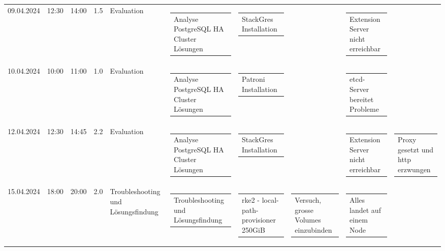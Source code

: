 {\begin{longtable}[H]{lllrllllll}
09.04.2024 & 12:30 & 14:00 & 1.5 & Evaluation & \begin{tabular}[c]{@{}l@{}}Analyse PostgreSQL HA Cluster Lösungen\end{tabular} & \begin{tabular}[c]{@{}l@{}}StackGres Installation\end{tabular} & \begin{tabular}[c]{@{}l@{}}\end{tabular} & \begin{tabular}[c]{@{}l@{}}Extension Server nicht erreichbar\end{tabular} & \begin{tabular}[c]{@{}l@{}}\end{tabular} \\
10.04.2024 & 10:00 & 11:00 & 1.0 & Evaluation & \begin{tabular}[c]{@{}l@{}}Analyse PostgreSQL HA Cluster Lösungen\end{tabular} & \begin{tabular}[c]{@{}l@{}}Patroni Installation\end{tabular} & \begin{tabular}[c]{@{}l@{}}\end{tabular} & \begin{tabular}[c]{@{}l@{}}etcd-Server bereitet Probleme\end{tabular} & \begin{tabular}[c]{@{}l@{}}\end{tabular} \\
12.04.2024 & 12:30 & 14:45 & 2.2 & Evaluation & \begin{tabular}[c]{@{}l@{}}Analyse PostgreSQL HA Cluster Lösungen\end{tabular} & \begin{tabular}[c]{@{}l@{}}StackGres Installation\end{tabular} & \begin{tabular}[c]{@{}l@{}}\end{tabular} & \begin{tabular}[c]{@{}l@{}}Extension Server nicht erreichbar\end{tabular} & \begin{tabular}[c]{@{}l@{}}Proxy gesetzt und http erzwungen\end{tabular} \\
15.04.2024 & 18:00 & 20:00 & 2.0 & Troubleshooting und Lösungsfindung & \begin{tabular}[c]{@{}l@{}}Troubleshooting und Lösungsfindung\end{tabular} & \begin{tabular}[c]{@{}l@{}}rke2 - local-path-provisioner 250GiB\end{tabular} & \begin{tabular}[c]{@{}l@{}}Versuch, grosse Volumes einzubinden\end{tabular} & \begin{tabular}[c]{@{}l@{}}Alles landet auf einem Node\end{tabular} & \begin{tabular}[c]{@{}l@{}}\end{tabular} \\

\end{longtable}}
